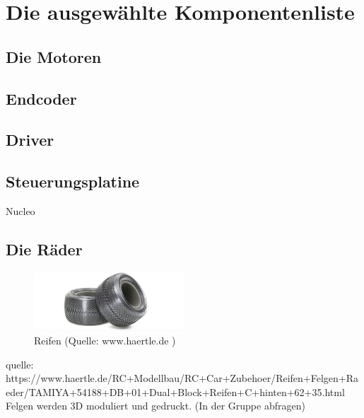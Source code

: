 \renewcommand{\autoren}{Valentyn Chepil}
\newpage
\section{Die ausgewählte Komponentenliste}
\subsection{Die Motoren}


\subsection{Endcoder}


\subsection{Driver}


\subsection{Steuerungsplatine}

Nucleo 

\subsection{Die Räder}

\begin{figure}[!h]  %
	\centering\includegraphics[width=0.5\textwidth]{images/reifen.png}
	\caption{Reifen \newline (Quelle: www.haertle.de )}
	\label{reifen} %
\end{figure}

quelle:
https://www.haertle.de/RC+Modellbau/RC+Car+Zubehoer/Reifen+Felgen+Raeder/TAMIYA+54188+DB+01+Dual+Block+Reifen+C+hinten+62+35.html
Felgen werden 3D moduliert und gedruckt. (In der Gruppe abfragen)

